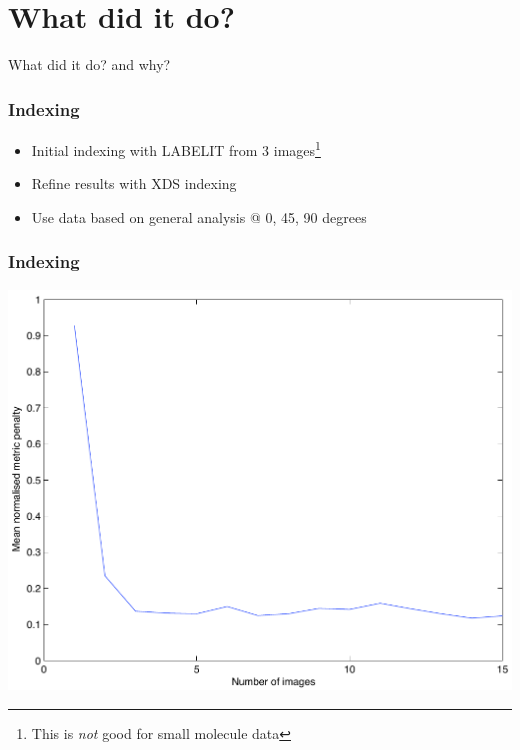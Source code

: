 \documentclass[slides,compress]{beamer}
\begin{document}
\section{What did it do?}

\begin{frame}
\begin{center}
\Huge What did it do? and why?
\end{center}
\end{frame}

\begin{frame}
\frametitle{Indexing}
\begin{itemize}
\item{Initial indexing with LABELIT from 3 images\footnote{This is \emph{not}
good for small molecule data}}
\item{Refine results with XDS indexing}
\item{Use data based on general analysis @ 0, 45, 90 degrees}
\end{itemize}
\end{frame}

\begin{frame}
\frametitle{Indexing}
\hspace{3cm}
\includegraphics[scale=0.5]{figures/no_images.pdf}
\end{frame}
\end{document}
